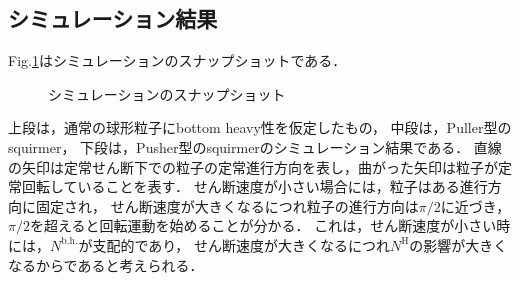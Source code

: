 \subsection{シミュレーション結果}
Fig.\ref{snapshots}はシミュレーションのスナップショットである．
    \begin{figure}[htbp]
        \label{snapshots}
        \caption{シミュレーションのスナップショット}
    \end{figure}

\noindent
上段は，通常の球形粒子にbottom heavy性を仮定したもの，
中段は，Puller型のsquirmer，
下段は，Pusher型のsquirmerのシミュレーション結果である．
直線の矢印は定常せん断下での粒子の定常進行方向を表し，曲がった矢印は粒子が定常回転していることを表す．
せん断速度が小さい場合には，粒子はある進行方向に固定され，
せん断速度が大きくなるにつれ粒子の進行方向は$\pi / 2$に近づき，
$\pi / 2$を超えると回転運動を始めることが分かる．
これは，せん断速度が小さい時には，$N^\mathrm{b.h.}$が支配的であり，
せん断速度が大きくなるにつれ$N^\mathrm{H}$の影響が大きくなるからであると考えられる．
